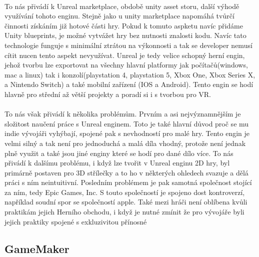 
\paragraph{}
	To nás přivádí k Unreal marketplace, obdobě unity asset storu, další výhodě využívání tohoto enginu.
	Stejně jako u unity marketplace napomáhá tvůrčí činnosti získáním již hotové části hry.
	Pokud k tomuto aspketu navíc přidáme Unity blueprints, je možné vytvážet hry bez nutnosti znalosti kodu.
	Navíc tato technologie funguje s minimální ztrátou na výkonnosti a tak se developer nemusí cítit nucen tento aspekt nevyužívat.
	Unreal je tedy velice schopný herní engin, jehož tvorbu lze exportovat na všechny hlavní platformy jak počítačů(windows, mac a linux)
		tak i konzolí(playstation 4, playstation 5, Xbox One, Xbox Series X, a Nintendo Switch) a také mobilní zařízení (IOS a Android).
	Tento engin se hodí hlavně pro střední až větší projekty a poradí si i s tvorbou pro VR.

\paragraph{}
	To nás však přivádí k několika problémům.
	Prvním a asi nejvýznamnějším je složitost naučení práce s Unreal enginem.
	Toto je také hlavní důvod proč se mu indie vývojáři vyhýbají, spojené pak s nevhodností pro malé hry.
	Tento engin je velmi silný a tak není pro jednoduchá a malá díla vhodný, protože není jednak plně využit a také jsou jiné enginy které se hodí pro dané dílo více.
	To nás přivádí k dalšímu problému, i když lze tvořit v Unreal enginu 2D hry, byl primárně postaven pro 3D střílečky a to ho v některých ohledech svazuje a dělá práci s ním neintuitivní.
	Posledním problémem je pak samotná společnost stojící za ním, tedy Epic Games, Inc.
	S touto společností je spojeno dost kontroverzí, například soudní spor se společností apple\cite{epic_apple_lawsuit}.
	Také mezi hráči není oblíbena kvůli praktikám jejich Herního obchodu, i když je nutné zmínit že pro vývojáře byli jejich praktiky spojené s exkluzivitou přínosné\cite{epic_games_exclusives}

\subsection{GameMaker}

